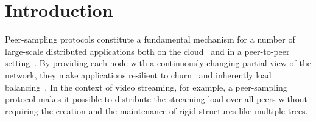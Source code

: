 
\section{Introduction}

Peer-sampling
protocols\cite{voulgaris2005cyclon,jelasity2007gossip,tolgyeski2009adaptive}
constitute a fundamental mechanism for a number of large-scale
distributed applications both on the cloud~\cite{decandia2007dynamo}
and in a peer-to-peer
setting~\cite{Frey09Middleware,voulgaris2005sub,wuhib2009robust}. By
providing each node with a continuously changing partial view of the
network, they make applications resilient to churn~\cite{bertier-d2ht}
and inherently load balancing~\cite{Frey09DSN}. In the context of
video streaming, for example, a peer-sampling protocol makes it
possible to distribute the streaming load over all peers without
requiring the creation and the maintenance of rigid structures like
multiple trees\cite{Frey09DSN, monod:THESIS}.  




